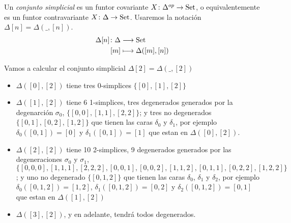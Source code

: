 \documentclass[../main.tex]{subfiles}
\begin{document}
\begin{defi}
    Un \emph{conjunto simplicial} es un funtor covariante $X\colon\Delta^{op} \to \mathop{\rm Set}$, o equivalentemente es un funtor contravariante $X\colon \Delta \to \mathop{\rm Set}$.
    Usaremos la notaci\'on $\Delta[n]=\Delta(\_,[n])$.
    \begin{align*}
        \Delta[n]\colon \Delta & \longrightarrow \mathop{\rm Set} \\
        [m]                    & \longmapsto\!
        \begin{aligned}[t]
            \Delta([m],[n])
        \end{aligned}
    \end{align*}
\end{defi}
\begin{ex}
    Vamos a calcular el conjunto simplicial $\Delta[2]=\Delta(\_,[2])$
    \begin{itemize}
        \item $\Delta([0],[2])$ tiene tres 0-simplices $\{[0],[1],[2]\}$
        \item $\Delta([1],[2])$ tiene 6 1-simplices, tres degenerados generados por la degenarci\'on $\sigma_0$, $\{[0,0],[1,1],[2,2]\}$; y tres no degenerados $\{[0,1],[0,2],[1,2]\}$ que tienen las caras $\delta_0$ y $\delta_1$, por ejemplo $\delta_0([0,1]) = [0]$ y $\delta_1([0,1]) = [1]$ que estan en $\Delta([0],[2])$.
        \item $\Delta([2],[2])$ tiene 10 2-simplices, 9 degenerados generados por las degeneraciones $\sigma_0$ y $\sigma_1$, $\{[0,0,0],[1,1,1],[2,2,2],[0,0,1],[0,0,2],[1,1,2],[0,1,1],[0,2,2],[1,2,2]\}$; y uno no degenerado $\{[0,1,2]\}$ que tienen las caras $\delta_0$, $\delta_1$ y $\delta_2$, por ejemplo $\delta_0([0,1,2]) = [1,2]$, $\delta_1([0,1,2]) = [0,2]$ y $\delta_2([0,1,2]) = [0,1]$ que estan en $\Delta([1],[2])$
        \item $\Delta([3],[2])$, y en adelante, tendr\'a todos degenerados.
    \end{itemize}
\end{ex}


\end{document}

